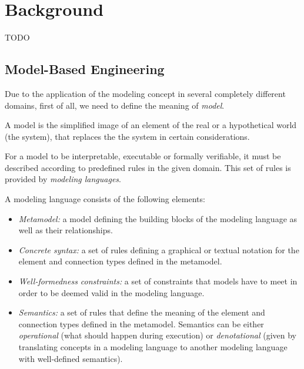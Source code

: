 \chapter{Background}
TODO 

\section{Model-Based Engineering}
Due to the application of the modeling concept in several completely different domains, first of all, we need to define the meaning of \textit{model}.
\begin{definition}[Model]
	A model is the simplified image of an element of the real or a hypothetical world (the system), that replaces the the system in certain considerations.
\end{definition}

For a model to be interpretable, executable or formally verifiable, it must be described according to predefined rules in the given domain. This set of rules is provided by \textit{modeling languages}.
\begin{definition}
	A modeling language consists of the following elements:
	\begin{itemize}
		\item \emph{Metamodel:} a model defining the building blocks of the modeling language as well
		as their relationships.
		\item \emph{Concrete syntax:} a set of rules defining a graphical or textual notation for the
		element and connection types defined in the metamodel.
		\item \emph{Well-formedness constraints:} a set of constraints that models have to meet in order
		to be deemed valid in the modeling language.
		\item \emph{Semantics:} a set of rules that define the meaning of the element and connection
		types defined in the metamodel. Semantics can be either \textit{operational} (what should happen during execution) or \textit{denotational} (given by translating concepts in a modeling language to another modeling language with well-defined semantics).
	\end{itemize}
\end{definition}


